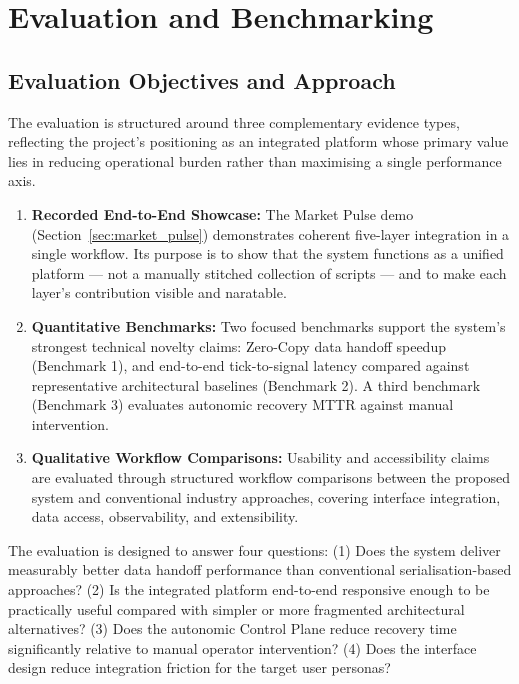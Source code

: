 \documentclass[12pt, a4paper]{report}
\begin{document}
\chapter{Evaluation and Benchmarking}
\label{ch:evaluation}

\section{Evaluation Objectives and Approach}
\label{sec:eval_objectives}

The evaluation is structured around three complementary evidence types, reflecting
the project's positioning as an integrated platform whose primary value lies in
reducing operational burden rather than maximising a single performance axis.

\begin{enumerate}
  \item \textbf{Recorded End-to-End Showcase:} The Market Pulse demo
  (Section~\ref{sec:market_pulse}) demonstrates coherent five-layer integration in a
  single workflow. Its purpose is to show that the system functions as a unified
  platform — not a manually stitched collection of scripts — and to make each layer's
  contribution visible and naratable.
  \item \textbf{Quantitative Benchmarks:} Two focused benchmarks support the
  system's strongest technical novelty claims: Zero-Copy data handoff speedup
  (Benchmark 1), and end-to-end tick-to-signal latency compared against
  representative architectural baselines (Benchmark 2). A third benchmark
  (Benchmark 3) evaluates autonomic recovery MTTR against manual intervention.
  \item \textbf{Qualitative Workflow Comparisons:} Usability and accessibility claims
  are evaluated through structured workflow comparisons between the proposed system
  and conventional industry approaches, covering interface integration, data access,
  observability, and extensibility.
\end{enumerate}

The evaluation is designed to answer four questions:
(1) Does the system deliver measurably better data handoff performance than
conventional serialisation-based approaches?
(2) Is the integrated platform end-to-end responsive enough to be practically useful
compared with simpler or more fragmented architectural alternatives?
(3) Does the autonomic Control Plane reduce recovery time significantly relative to
manual operator intervention?
(4) Does the interface design reduce integration friction for the target user personas?
\end{document}
